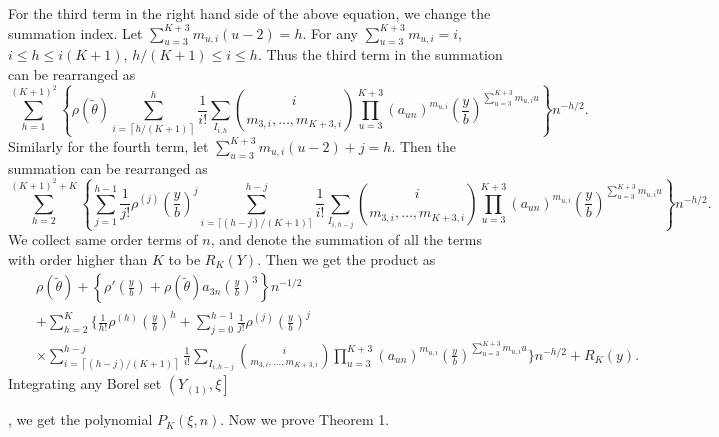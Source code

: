 For the third term in the right hand side of the above equation, we
change the summation index. Let $\sum_{u=3}^{K+3}m_{u,i}\left(u-2\right)=h$.
For any $\sum_{u=3}^{K+3}m_{u,i}=i$, $i\le h\le i\left(K+1\right)$,
$h/\left(K+1\right)\le i\le h$. Thus the third term in the summation can
be rearranged as 
\[
\sum_{h=1}^{\left(K+1\right)^{2}}\left\{ \rho\left(\tilde{\theta}\right)\sum_{i=\left\lceil h/\left(K+1\right)\right\rceil }^{h}\frac{1}{i!}\sum_{I_{i,h}}\binom{i}{m_{3,i},\ldots,m_{K+3,i}}\prod_{u=3}^{K+3}\left(a_{un}\right)^{m_{u,i}}\left(\frac{y}{b}\right)^{\sum_{u=3}^{K+3}m_{u,i}u}\right\} n^{-h/2}.
\]
Similarly for the fourth term, let $\sum_{u=3}^{K+3}m_{u,i}\left(u-2\right)+j=h$.
Then the summation can be rearranged as 
\[
\sum_{h=2}^{\left(K+1\right)^{2}+K}\left\{ \sum_{j=1}^{h-1}\frac{1}{j!}\rho^{\left(j\right)}\left(\frac{y}{b}\right)^{j}\sum_{i=\lceil \left(h-j\right)/\left(K+1\right) \rceil}^{h-j}\frac{1}{i!}\sum_{I_{i,h-j}}\binom{i}{m_{3,i},\ldots,m_{K+3,i}}\prod_{u=3}^{K+3}\left(a_{un}\right)^{m_{u,i}}\left(\frac{y}{b}\right)^{\sum_{u=3}^{K+3}m_{u,i}u}\right\} n^{-h/2}.
\]
We collect  same order terms of $n$, and denote the summation of
all the terms with order higher than $K$ to be $R_{K}\left(Y\right)$.
Then we get the product as 
\begin{eqnarray*}
 &  & \rho\left(\tilde{\theta}\right)+\left\{ \rho'\left(\frac{y}{b}\right)+\rho\left(\tilde{\theta}\right)a_{3n}\left(\frac{y}{b}\right)^{3}\right\} n^{-1/2}\\
 &  & +\sum_{h=2}^{K}\Bigg\{ \frac{1}{h!}\rho^{\left(h\right)}\left(\frac{y}{b}\right)^{h}+\sum_{j=0}^{h-1}\frac{1}{j!}\rho^{\left(j\right)}\left(\frac{y}{b}\right)^{j}\\
 &&\times\sum_{i=\left\lceil \left(h-j\right)/\left(K+1\right)\right\rceil }^{h-j}\frac{1}{i!}\sum_{I_{i,h-j}}\binom{i}{m_{3,i},\ldots,m_{K+3,i}}\prod_{u=3}^{K+3}\left(a_{un}\right)^{m_{u,i}}\left(\frac{y}{b}\right)^{\sum_{u=3}^{K+3}m_{u,i}u}\Bigg\} n^{-h/2}+R_{K}\left(y\right).
\end{eqnarray*}
 Integrating any Borel set $\left(Y_{\left(1\right)},\xi\right]$%
\begin{comment}
change into x1 to xi
\end{comment}
, we get the polynomial $P_{K}\left(\xi,n\right)$. Now we prove Theorem
1.%


